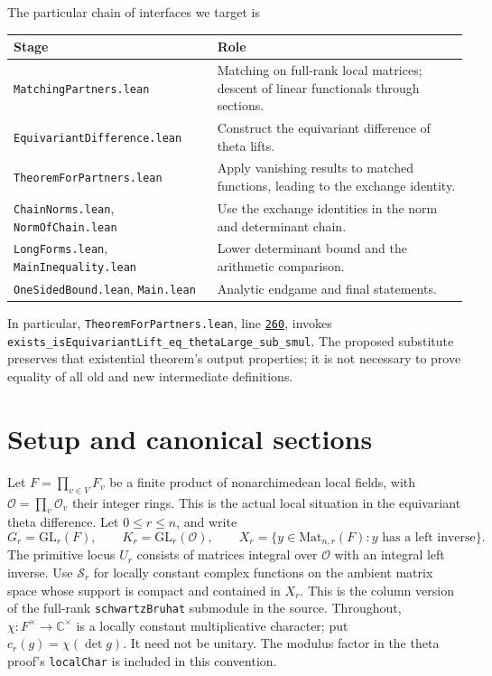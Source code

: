\documentclass[11pt]{article}
\theoremstyle{remark}\newtheorem{remark}[theorem]{Remark}
\newcommand{\GL}{\mathrm{GL}}
\newcommand{\Mat}{\mathrm{Mat}}
\newcommand{\SB}{\mathcal S}
\newcommand{\cc}{\mathbb C}
\newcommand{\oo}{\mathcal O}
\newcommand{\src}[2]{\href{https://github.com/VladimirReshetnikov/ProveIt/blob/ee10f937fedac0955d28b7b860f4c44fab508204/Analysis/GeneralizedRiemannHypothesis/Lean/grh/src/#1\#L#2}{\texttt{#2}}}
\begin{document}
The particular chain of interfaces we target is
\begin{center}
\begin{tabularx}{\linewidth}{@{}lX@{}}
\toprule
Stage & Role \\
\midrule
\texttt{MatchingPartners.lean} & Matching on full-rank local matrices; descent of linear functionals through sections. \\
\texttt{EquivariantDifference.lean} & Construct the equivariant difference of theta lifts. \\
\texttt{TheoremForPartners.lean} & Apply vanishing results to matched functions, leading to the exchange identity. \\
\texttt{ChainNorms.lean}, \texttt{NormOfChain.lean} & Use the exchange identities in the norm and determinant chain. \\
\texttt{LongForms.lean}, \texttt{MainInequality.lean} & Lower determinant bound and the arithmetic comparison. \\
\texttt{OneSidedBound.lean}, \texttt{Main.lean} & Analytic endgame and final statements. \\
\bottomrule
\end{tabularx}
\end{center}
In particular, \texttt{TheoremForPartners.lean}, line \src{New/Determinant/Exchange/TheoremForPartners.lean}{260}, invokes \texttt{exists\_\allowbreak isEquivariantLift\_\allowbreak eq\_\allowbreak thetaLarge\_\allowbreak sub\_\allowbreak smul}. The proposed substitute preserves that existential theorem's output properties; it is not necessary to prove equality of all old and new intermediate definitions.

\section{Setup and canonical sections}
Let $F=\prod_{v\in V}F_v$ be a finite product of nonarchimedean local fields, with $\oo=\prod_v\oo_v$ their integer rings. This is the actual local situation in the equivariant theta difference. Let $0\le r\le n$, and write
\[
 G_r=\GL_r(F),\qquad K_r=\GL_r(\oo),\qquad
 X_r=\{y\in\Mat_{n,r}(F): y\text{ has a left inverse}\}.
\]
The primitive locus $U_r$ consists of matrices integral over $\oo$ with an integral left inverse. Use $\SB_r$ for locally constant complex functions on the ambient matrix space whose support is compact and contained in $X_r$. This is the column version of the full-rank \texttt{schwartzBruhat} submodule in the source. Throughout, $\chi:F^\times\to\cc^\times$ is a locally constant multiplicative character; put $c_r(g)=\chi(\det g)$. It need not be unitary. The modulus factor in the theta proof's \texttt{localChar} is included in this convention.
\end{document}
